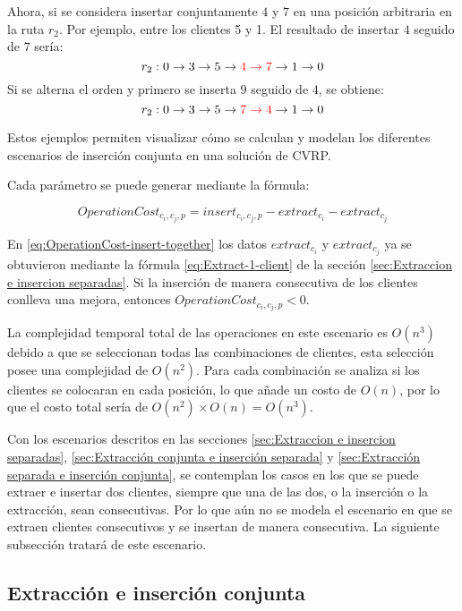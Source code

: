 \documentclass[12pt]{report}
\begin{document}
	Ahora, si se considera insertar conjuntamente $4$ y $7$ en una posición arbitraria en la ruta $r_2 $. Por ejemplo, entre los clientes 5 y 1. El resultado de insertar $4$ seguido de $7$ sería:
	\[
	r_2: 0 \rightarrow 3 \rightarrow 5 \rightarrow \textcolor{red}{4 \rightarrow 7} \rightarrow 1 \rightarrow 0
	\]
	Si se alterna el orden y primero se inserta \(9\) seguido de \(4\), se obtiene:
	\[
	r_2: 0 \rightarrow 3 \rightarrow 5 \rightarrow \textcolor{red}{7 \rightarrow 4} \rightarrow 1 \rightarrow 0
	\]

	Estos ejemplos permiten visualizar cómo se calculan y modelan los diferentes escenarios de inserción conjunta en una solución de CVRP.

	Cada parámetro se puede generar mediante la fórmula:

	\begin{equation}
		OperationCost_{c_i,c_j,p} = insert_{c_i,c_j,p} - extract_{c_i} - extract_{c_j}
		\label{eq:OperationCost-insert-together}
	\end{equation}

	En \ref{eq:OperationCost-insert-together} los datos $extract_{c_i}$ y $extract_{c_j}$ ya se obtuvieron mediante la fórmula \ref{eq:Extract-1-client} de la sección \ref{sec:Extraccion e insercion separadas}.
	Si la inserción de manera consecutiva de los clientes conlleva una mejora, entonces $OperationCost_{c_i,c_j,p} < 0$.

	La complejidad temporal total de las operaciones en este escenario es $O(n^3)$ debido a que se seleccionan todas las combinaciones de clientes, esta selección posee una complejidad de $O(n^2)$. Para cada combinación se analiza si los clientes se colocaran en cada posición, lo que añade un costo de $O(n)$, por lo que el costo total sería de $O(n^2) \times O(n) = O(n^3)$.

	Con los escenarios descritos en las secciones \ref{sec:Extraccion e insercion separadas}, \ref{sec:Extracción conjunta e inserción separada} y \ref{sec:Extracción separada e inserción conjunta}, se contemplan los casos en los que se puede extraer e insertar dos clientes, siempre que una de las dos, o la inserción o la extracción, sean consecutivas. Por lo que aún no se modela el escenario en que se extraen clientes consecutivos y se insertan de manera consecutiva. La siguiente subsección tratará de este escenario.

	\subsection{Extracción e inserción conjunta}
	\label{sec:Extracción e inserción conjunta}
\end{document}
